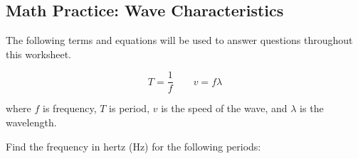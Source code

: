 \documentclass[]{exam}
\begin{document}
\ifprintanswers
\clearpage
\fi


\subsection*{Math Practice: Wave Characteristics}

The following terms and equations will be used to answer questions throughout this worksheet.

\begin{equation*}
    T = \frac{1}{f} \qquad v = f \lambda
\end{equation*}

where $f$ is frequency, $T$ is period, $v$ is the speed of the wave, and $\lambda$ is the wavelength. 


\begin{questions}
\question 
Find the frequency in hertz (Hz) for the following periods:



\end{questions}
\end{document}
